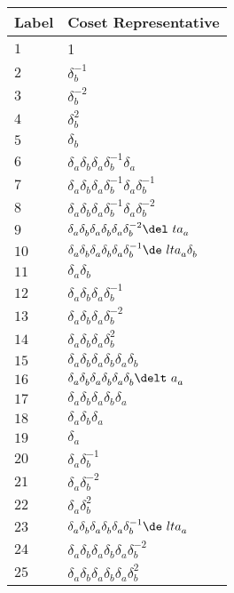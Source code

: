 \documentclass{article}
\begin{document}
\begin{center}
\begin{tabular}{ll}
\toprule
Label & Coset Representative\\
\midrule
$1$ & 1 \\
$2$ & $\delta_b^{-1}$ \\
$3$ & $\delta_b^{-2}$ \\
$4$ & $\delta_b^{2}$ \\
$5$ & $\delta_b^{}$ \\
$6$ & $\delta_a^{}\delta_b^{}\delta_a^{}\delta_b^{-1}\delta_a^{}$ \\
$7$ & $\delta_a^{}\delta_b^{}\delta_a^{}\delta_b^{-1}\delta_a^{}\delta_b^{-1}$ 
\\
$8$ & $\delta_a^{}\delta_b^{}\delta_a^{}\delta_b^{-1}\delta_a^{}\delta_b^{-2}$ 
\\
$9$ & $\delta_a^{}\delta_b^{}\delta_a^{}\delta_b^{}\delta_a^{}\delta_b^{-2}\del\
ta_a^{}$ \\
$10$ & $\delta_a^{}\delta_b^{}\delta_a^{}\delta_b^{}\delta_a^{}\delta_b^{-1}\de\
lta_a^{}\delta_b^{}$ \\
$11$ & $\delta_a^{}\delta_b^{}$ \\
$12$ & $\delta_a^{}\delta_b^{}\delta_a^{}\delta_b^{-1}$ \\
$13$ & $\delta_a^{}\delta_b^{}\delta_a^{}\delta_b^{-2}$ \\
$14$ & $\delta_a^{}\delta_b^{}\delta_a^{}\delta_b^{2}$ \\
$15$ & $\delta_a^{}\delta_b^{}\delta_a^{}\delta_b^{}\delta_a^{}\delta_b^{}$ \\
$16$ & $\delta_a^{}\delta_b^{}\delta_a^{}\delta_b^{}\delta_a^{}\delta_b^{}\delt\
a_a^{}$ \\
$17$ & $\delta_a^{}\delta_b^{}\delta_a^{}\delta_b^{}\delta_a^{}$ \\
$18$ & $\delta_a^{}\delta_b^{}\delta_a^{}$ \\
$19$ & $\delta_a^{}$ \\
$20$ & $\delta_a^{}\delta_b^{-1}$ \\
$21$ & $\delta_a^{}\delta_b^{-2}$ \\
$22$ & $\delta_a^{}\delta_b^{2}$ \\
$23$ & $\delta_a^{}\delta_b^{}\delta_a^{}\delta_b^{}\delta_a^{}\delta_b^{-1}\de\
lta_a^{}$ \\
$24$ & $\delta_a^{}\delta_b^{}\delta_a^{}\delta_b^{}\delta_a^{}\delta_b^{-2}$ \\
$25$ & $\delta_a^{}\delta_b^{}\delta_a^{}\delta_b^{}\delta_a^{}\delta_b^{2}$ \\

\end{tabular}
\end{center}
\end{document}
